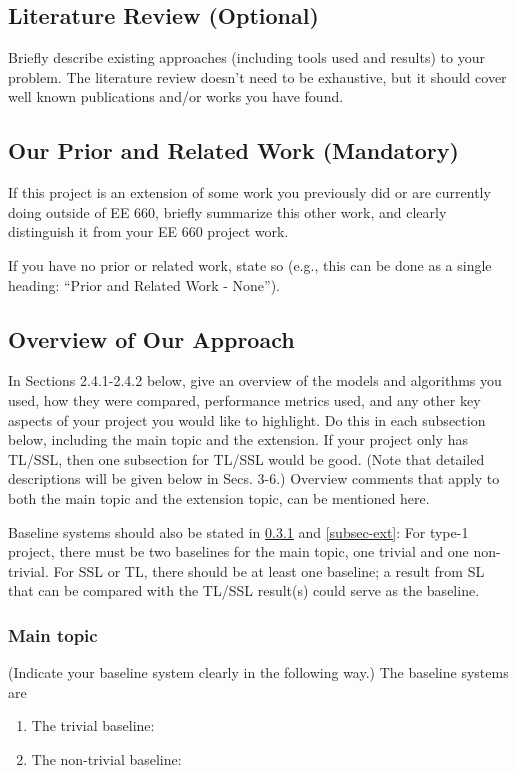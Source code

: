 \documentclass[singlecolumn]{article}
\begin{document}
\subsection{Literature Review (Optional)}
Briefly describe existing approaches (including tools used and results) to your problem. The literature review doesn’t need to be exhaustive, but it should cover well known publications and/or works you have found.

\subsection{Our Prior and Related Work (Mandatory)}
If this project is an extension of some work you previously did or are currently doing outside of EE 660, briefly summarize this other work, and clearly distinguish it from your EE 660 project work.  

If you have no prior or related work, state so (e.g., this can be done as a single heading: “Prior and Related Work - None”).   

\subsection{Overview of Our Approach}
In Sections 2.4.1-2.4.2 below, give an overview of the models and algorithms you used, how they were compared, performance metrics used, and any other key aspects of your project you would like to highlight. Do this in each subsection below, including the main topic and the extension. If your project only has TL/SSL, then one subsection for TL/SSL would be good. (Note that detailed descriptions will be given below in Secs. 3-6.)  Overview comments that apply to both the main topic and the extension topic, can be mentioned here.

Baseline systems should also be stated in \ref{subsec-main} and \ref{subsec-ext}: For type-1 project, there must be two baselines for the main topic, one trivial and one non-trivial. For SSL or TL, there should be at least one baseline; a result from SL that can be compared with the TL/SSL result(s) could serve as the baseline.  

\subsubsection{Main topic}\label{subsec-main}
(Indicate your baseline system clearly in the following way.)
The baseline systems are
\begin{enumerate}
	\item The trivial baseline:
	\item The non-trivial baseline:{}
\end{enumerate}
\end{document}
